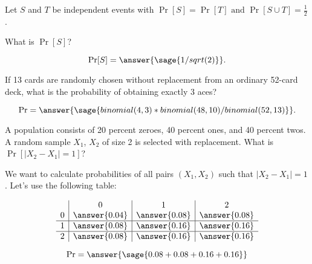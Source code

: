 \documentclass{ximera}
\begin{document}
\begin{problem}
 Let $S$ and $T$ be independent events with $\Pr[S] = \Pr[T] \text{ and }\Pr[S \cup T] = \frac{1}{2}$.

What is $\Pr[S]$? 

\begin{prompt}
$$\Pr[S]=\answer{\sage{1/sqrt(2)}}.$$
\end{prompt}

\end{problem}

\begin{problem}
If 13 cards are randomly chosen without replacement from an ordinary 52-card deck, what is the probability of obtaining exactly 3 aces? 

\begin{prompt}
$$\Pr=\answer{\sage{binomial(4,3)*binomial(48,10)/binomial(52,13)}}.$$
\end{prompt}

\end{problem}

\begin{problem}
A population consists of 20 percent zeroes, 40 percent ones, and 40 percent twos. A random sample $X_1$, $X_2$ of size 2 is selected with replacement. What is $\Pr[|X_2-X_1|=1]$?
\begin{hint}
We want to calculate probabilities of all pairs $(X_1,X_2)$ such that $|X_2-X_1|=1$. Let's use the following table:

$$
\begin{array}{c|c|c|c}
  & 0 & 1 & 2 \\
0 &\answer{0.04} & \answer{0.08} & \answer{0.08} \\
\hline
1 &\answer{0.08} & \answer{0.16} & \answer{0.16} \\
\hline
2 &\answer{0.08} & \answer{0.16} & \answer{0.16} \\
\end{array}
$$
\end{hint}

\begin{prompt}
$$\Pr=\answer{\sage{0.08+0.08+0.16+0.16}}$$
\end{prompt}

\end{problem}
\end{document}
